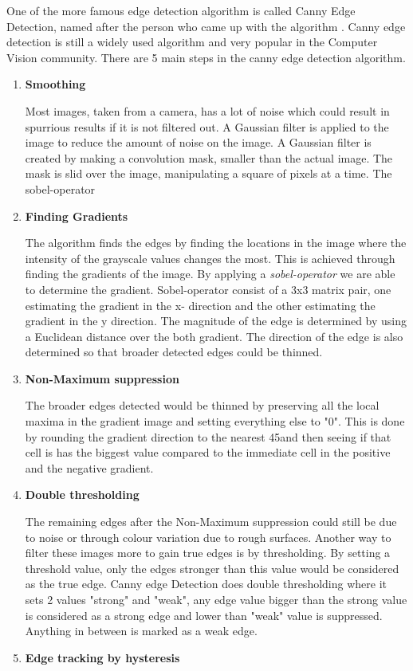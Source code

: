 One of the more famous edge detection algorithm is called Canny Edge Detection\cite{canny-paper}, named after the person who came up with the algorithm \citeauthor{canny-paper}. Canny edge detection is still a widely used algorithm and very popular in the Computer Vision community. There are 5 main steps in the canny edge detection algorithm\cite{canny-tutorial}.
\begin{enumerate}
\item \textbf{Smoothing}

Most images, taken from a camera, has a lot of noise which could result in spurrious results if it is not filtered out. A Gaussian filter is applied to the image to reduce the amount of noise on the image. A Gaussian filter is created by making a convolution mask, smaller than the actual image. The mask is slid over the image, manipulating a square of pixels at a time\cite{canny-tutorial2}. The sobel-operator
\item \textbf{Finding Gradients}

The algorithm finds the edges by finding the locations in the image where the intensity of the grayscale values changes the most. This is achieved through finding the gradients of the image. By applying a \emph{sobel-operator} we are able to determine the gradient\cite{sobel-operator}. Sobel-operator consist of a 3x3 matrix pair, one estimating the gradient in the x- direction and the other estimating the gradient in the y direction. The magnitude of the edge is determined by using a Euclidean distance over the both gradient. The direction of the edge is also determined so that broader detected edges could be thinned.
\item \textbf{Non-Maximum suppression}

The broader edges detected would be thinned by preserving all the local maxima in the gradient image and setting everything else to "0". This is done by rounding the gradient direction to the nearest 45\textdegree and then seeing if that cell is has the biggest value compared to the immediate cell in the positive and the negative gradient. 
\item \textbf{Double thresholding}

The remaining edges after the Non-Maximum suppression could still be due to noise or through colour variation due to rough surfaces. Another way to filter these images more to gain true edges is by thresholding. By setting a threshold value, only the edges stronger than this value would be considered as the true edge. Canny edge Detection does double thresholding where it sets 2 values "strong" and "weak", any edge value bigger than the strong value is considered as a strong edge and lower than "weak"  value is suppressed. Anything in between is marked as a weak edge.
\item \textbf{Edge tracking by hysteresis}


\end{enumerate}
